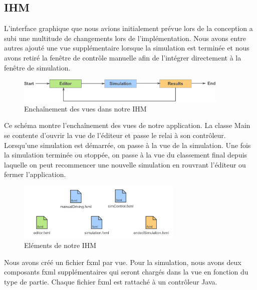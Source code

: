 \documentclass[a4paper, 12pt]{article}
\begin{document}
\subsection{IHM}
L'interface graphique que nous avions initialement prévue lors de la conception a subi une multitude de changements lors de l'implémentation. Nous avons entre autres ajouté une vue supplémentaire lorsque la simulation est terminée et nous avons retiré la fenêtre de contrôle manuelle afin de l'intégrer directement à la fenêtre de simulation.
\begin{figure}[H]
 \centering
 \includegraphics[width=0.9\textwidth]{includes/images/enchainementvue}
 \caption{\label{fig:echainement_vue}Enchaînement des vues dans notre IHM}
\end{figure}
Ce schéma montre l'enchaînement des vues de notre application. La classe Main se contente d'ouvrir la vue de l'éditeur et passe le relai à son contrôleur. Lorsqu'une simulation est démarrée, on passe à la vue de la simulation. Une fois la simulation terminée ou stoppée, on passe à la vue du classement final depuis laquelle on peut recommencer une nouvelle simulation en rouvrant l'éditeur ou fermer l'application.
\begin{figure}[H]
 \centering
 \includegraphics[width=0.7\textwidth]{includes/images/fichiersfxml}
 \caption{\label{fig:fichierfxml}Eléments de notre IHM}
\end{figure}
Nous avons créé un fichier fxml par vue. Pour la simulation, nous avons deux composants fxml supplémentaires qui seront chargés dans la vue en fonction du type de partie. Chaque fichier fxml est rattaché à un contrôleur Java. 
\end{document}
